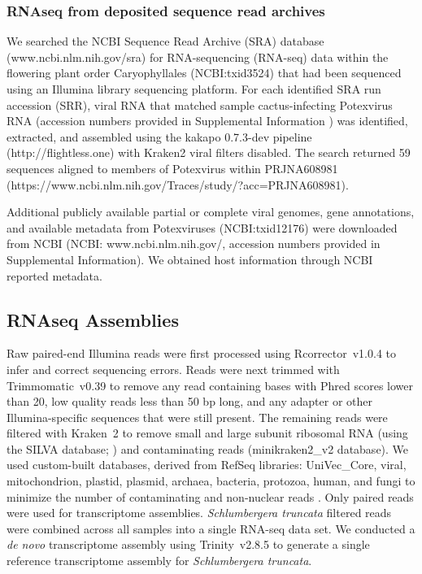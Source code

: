 \documentclass[fleqn,10pt,lineno]{wlpeerj}
\begin{document}
\subsubsection*{RNAseq from deposited sequence read archives}

We searched the NCBI Sequence Read Archive (SRA) database (www.ncbi.nlm.nih.gov/sra) for RNA-sequencing (RNA-seq) data within the flowering plant order Caryophyllales (NCBI:txid3524) that had been sequenced using an Illumina library sequencing platform. 
For each identified SRA run accession (SRR), viral RNA that matched sample cactus-infecting Potexvirus RNA (accession numbers provided in Supplemental Information ) was identified, extracted, and assembled using the kakapo 0.7.3-dev pipeline (http://flightless.one) with Kraken2 viral filters disabled. 
The search returned 59 sequences aligned to members of Potexvirus within PRJNA608981 (https://www.ncbi.nlm.nih.gov/Traces/study/?acc=PRJNA608981).

Additional publicly available partial or complete viral genomes, gene annotations, and available metadata from Potexviruses (NCBI:txid12176) were downloaded from NCBI (NCBI: www.ncbi.nlm.nih.gov/, accession numbers provided in Supplemental Information).
We obtained host information through NCBI reported metadata.

\subsection*{RNAseq Assemblies}

Raw paired-end Illumina reads were first processed using \mbox{Rcorrector}~v1.0.4 \citep{song2015} to infer and correct sequencing errors.
Reads were next trimmed with \mbox{Trimmomatic}~v0.39 \citep{bolger2014} to remove any read containing bases with Phred scores lower than 20, low quality reads less than 50 bp long, and any adapter or other Illumina-specific sequences that were still present.
The remaining reads were filtered with \mbox{Kraken}~2 \citep{wood2019} to remove small and large subunit ribosomal RNA (using the SILVA database; \citealt{quast2013}) and contaminating reads (minikraken2\_v2 database).
We used custom-built databases, derived from RefSeq libraries: UniVec\_Core, viral, mitochondrion, plastid, plasmid, archaea, bacteria, protozoa, human, and fungi to minimize the number of contaminating and non-nuclear reads \citep{ramanauskas2021}.
Only paired reads were used for transcriptome assemblies.
\textit{Schlumbergera truncata} filtered reads were combined across all samples into a single RNA-seq data set.
We conducted a \textit{de novo} transcriptome assembly using \mbox{Trinity}~v2.8.5 \citep{grabherr2011} 
to generate a single reference transcriptome assembly for \textit{Schlumbergera truncata}.
\end{document}
